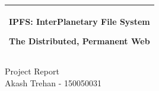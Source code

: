 %
%
%
%
%
\begin{titlepage}
  \addtolength{\hoffset}{0.5\evensidemargin-0.5\oddsidemargin} %
  \noindent%
  \begin{tabular}{@{}p{\textwidth}@{}}
    \toprule[2pt]
    \midrule
    \vspace{0.2cm}
    \begin{center}
    \Huge{\textbf{
      IPFS: InterPlanetary File System%
    }}
    \end{center}
    \begin{center}
      \Large{
        The Distributed, Permanent Web%
      }
    \end{center}
    \vspace{0.2cm}\\
    \midrule
    \toprule[2pt]
  \end{tabular}
  \vspace{4 cm}
  \begin{center}
    {\large
      Project Report%
    }\\
    \vspace{0.2cm}
    {\Large
      Akash Trehan - 150050031%
    }
  \end{center}
  \vfill
    \ifx\titlepageleftcolumnwidth\undefined
      \newlength{\titlepageleftcolumnwidth}
      \newlength{\titlepagerightcolumnwidth}
    \fi
    \setlength{\titlepageleftcolumnwidth}{0.3\textwidth-\tabcolsep}
    \setlength{\titlepagerightcolumnwidth}{\textwidth-2\tabcolsep-\titlepageleftcolumnwidth}
    \vspace {1cm}
    \begin{center}

\end{center}
\end{titlepage}
